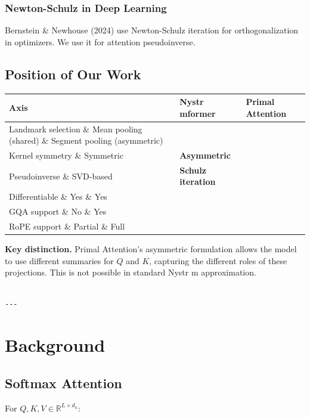 \subsubsection{Newton-Schulz in Deep Learning}

Bernstein \& Newhouse (2024) use Newton-Schulz iteration for orthogonalization 
in optimizers. We use it for attention pseudoinverse.

\subsection{Position of Our Work}

\begin{table}[H]
\centering
\small
\begin{tabular}{lll}
\toprule
\textbf{Axis} & \textbf{Nystr mformer} & \textbf{Primal Attention} \\
\midrule
Landmark selection \& Mean pooling (shared) \& Segment pooling (asymmetric) \\
Kernel symmetry \& Symmetric & \textbf{Asymmetric} \\
Pseudoinverse \& SVD-based & \textbf{Schulz iteration} \\
Differentiable \& Yes \& Yes \\
GQA support \& No \& Yes \\
RoPE support \& Partial \& Full \\
\bottomrule
\end{tabular}
\end{table}

\textbf{Key distinction.} Primal Attention's asymmetric formulation allows the 
model to use different summaries for $Q$ and $K$, capturing the different 
roles of these projections. This is not possible in standard Nystr m 
approximation.
\begin{lstlisting}

---
\end{lstlisting}


\section{Background}

\subsection{Softmax Attention}

For $Q, K, V \in \mathbb{R}^{L \times d_h}$:

